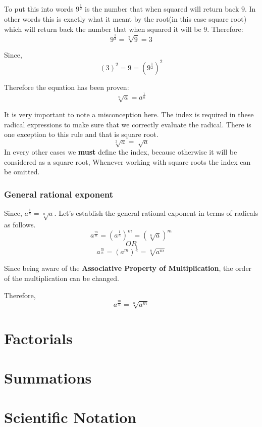 \documentclass[a4paper,12pt]{book}
\begin{document}
To put this into words $ 9^{\frac{1}{2}} $ is the number that when squared will return back $ 9 $. In other words this is exactly what it meant by the root(in this case square root) which will return back the number that when squared it will be 9. Therefore: 
$$ 9^{\frac{1}{2}} =  \sqrt[2]{9} = 3 $$

Since,
$$ (3)^2 = 9 = (9^{\frac{1}{2}})^2 $$

Therefore the equation has been proven: 
$$ \sqrt[n]{a} = a^{\frac{1}{n}} $$

It is very important to note a misconception here. The index is required in these radical expressions to make sure that we correctly evaluate the radical. There is one exception to this rule and that is square root.
$$ \sqrt[2]{a} = \sqrt[]{a} $$
In every other cases we \textbf{must} define the index, because otherwise it will be considered as a square root, Whenever working with square roots the index can be omitted.

\subsubsection{General rational exponent}
Since, $ a^{\frac{1}{n}} = \sqrt[n]{a} $.
Let's establish the general rational exponent in terms of radicals as follows. 
$$ a^{\frac{m}{n}} = (a^{\frac{1}{n}}) ^{m} = (\sqrt[n]{a})^m $$
$$ OR $$
$$ a^{\frac{m}{n}} = (a^m) ^{\frac{1}{n}} = \sqrt[n]{a^m} $$

Since being aware of the \textbf{Associative Property of Multiplication}, the order of the multiplication can be changed. 

Therefore, 
$$ a^{\frac{m}{n}} = \sqrt[n]{a^m} $$


\section{Factorials}
\section{Summations}
\section{Scientific Notation}
\end{document}
